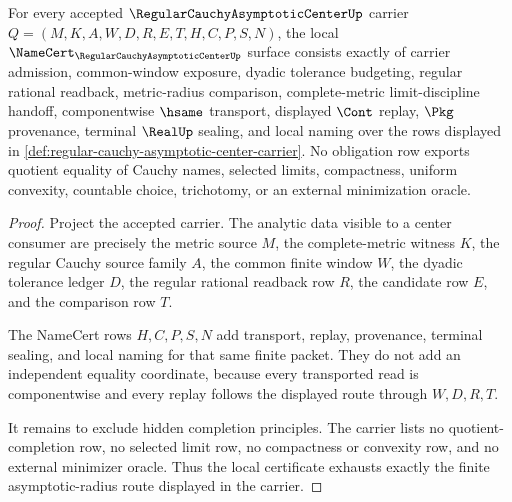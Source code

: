 \begin{theorem}
\label{thm:regular-cauchy-asymptotic-center-namecert-obligations}
For every accepted $\RegularCauchyAsymptoticCenterUp$ carrier $Q=(M,K,A,W,D,R,E,T,H,C,P,S,N)$, the local $\NameCert_{\RegularCauchyAsymptoticCenterUp}$ surface consists exactly of carrier admission, common-window exposure, dyadic tolerance budgeting, regular rational readback, metric-radius comparison, complete-metric limit-discipline handoff, componentwise $\hsame$ transport, displayed $\Cont$ replay, $\Pkg$ provenance, terminal $\RealUp$ sealing, and local naming over the rows displayed in \autoref{def:regular-cauchy-asymptotic-center-carrier}. No obligation row exports quotient equality of Cauchy names, selected limits, compactness, uniform convexity, countable choice, trichotomy, or an external minimization oracle.
\end{theorem}
\begin{proof}
Project the accepted carrier. The analytic data visible to a center consumer are precisely the metric source $M$, the complete-metric witness $K$, the regular Cauchy source family $A$, the common finite window $W$, the dyadic tolerance ledger $D$, the regular rational readback row $R$, the candidate row $E$, and the comparison row $T$.

The NameCert rows $H,C,P,S,N$ add transport, replay, provenance, terminal sealing, and local naming for that same finite packet. They do not add an independent equality coordinate, because every transported read is componentwise and every replay follows the displayed route through $W,D,R,T$.

It remains to exclude hidden completion principles. The carrier lists no quotient-completion row, no selected limit row, no compactness or convexity row, and no external minimizer oracle. Thus the local certificate exhausts exactly the finite asymptotic-radius route displayed in the carrier.
\end{proof}


